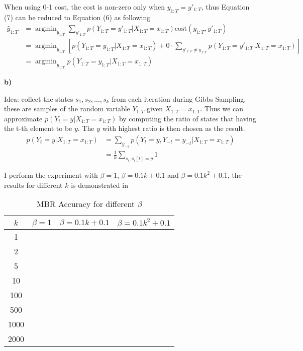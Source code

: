 \documentclass{article}
\DeclareMathOperator*{\argmin}{argmin}
\begin{document}
When using 0-1 cost, the cost is non-zero only when $y_{1:T} = y'_{1:T}$, thus Equation (7) can be reduced to Equation (6) 
as following
\begin{align*}
\hat y_{1:T} &= \argmin_{y_{1:T}} \sum_{y'_{1:T}}p(Y_{1:T} = y'_{1:T} | X_{1:T} = x_{1:T})\text{cost}(y_{1:T}, y'_{1:T}) \\
&=\argmin_{y_{1:T}}\left[p(Y_{1:T} = y_{1:T} | X_{1:T} = x_{1:T}) + 0\cdot\sum_{y'_{1:T} \neq y_{1:T}}p(Y_{1:T} = y'_{1:T} | X_{1:T} = x_{1:T})\right]\\
&=\argmin_{y_{1:T}}p(Y_{1:T} = y_{1:T} | X_{1:T} = x_{1:T})
\end{align*}

\textbf{b)}

Idea: collect the states $s_1, s_2,\hdots,s_k$ from each iteration during Gibbs Sampling, these are samples of the random variable $Y_{1:T}$ given $X_{1:T} = x_{1:T}$. Thus we can approximate $p(Y_t = y|X_{1:T}=x_{1:T})$ by computing the ratio of states that having
the t-th element to be $y$. The $y$ with highest ratio is then chosen as the result.
\begin{align*}
p(Y_t = y|X_{1:T}=x_{1:T}) &= \sum_{y_{-1}}p(Y_t = y, Y_{-t} = y_{-t}|X_{1:T} =x_{1:T})\\
&=\frac{1}{k}\sum_{s_i, s_i[t] = y} 1
\end{align*}

I perform the experiment with $\beta = 1$, $\beta = 0.1k+0.1$ and $\beta = 0.1k^2+0.1$, the results for different $k$ is demonstrated in 

\begin{table}
\centering
\begin{tabular}{c|c|c|c}
\textbf{$k$} &$\beta=1$ &\textbf{$\beta = 0.1k+0.1$} & \textbf{$\beta=0.1k^2+0.1$} \\\hline
1 & & & \\\hline
2 & & &\\\hline
5 & & & \\\hline
10 & & & \\\hline
100 & &  &\\\hline
500 & &  &\\\hline
1000 &  & & \\\hline
2000 &  & & \\
\end{tabular}
\caption{MBR Accuracy for different $\beta$}
\label{tab:mbr}
\end{table}
\end{document}

